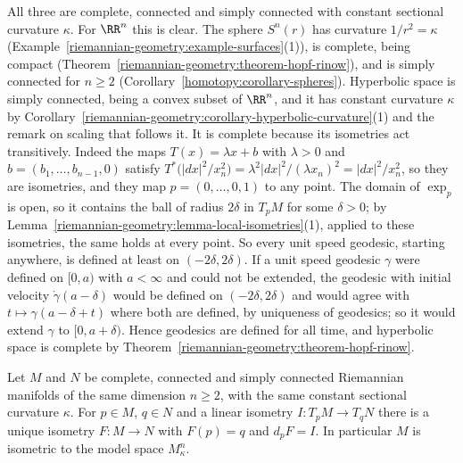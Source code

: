 All three are complete, connected and simply connected with constant sectional curvature $\kappa$. For $\RR^n$ this is clear. The sphere $S^n(r)$ has curvature
$1/r^2 = \kappa$ (Example~\ref{riemannian-geometry:example-surfaces}(1)), is complete, being compact (Theorem~\ref{riemannian-geometry:theorem-hopf-rinow}), and is simply
connected for $n \geq 2$ (Corollary~\ref{homotopy:corollary-spheres}). Hyperbolic space is simply connected, being a convex subset of $\RR^n$, and it has constant curvature $\kappa$ by
Corollary~\ref{riemannian-geometry:corollary-hyperbolic-curvature}(1) and the remark on scaling that follows it. It is complete because its isometries act transitively. Indeed the maps
$T(x) = \lambda x + b$ with $\lambda > 0$ and $b = (b_1, \ldots, b_{n-1}, 0)$ satisfy $T^*\bigl(|dx|^2/x_n^2\bigr) = \lambda^2|dx|^2/(\lambda x_n)^2 = |dx|^2/x_n^2$, so they are isometries, and they map
$p = (0, \ldots, 0, 1)$ to any point. The domain of $\exp_p$ is open, so it contains the ball of radius $2\delta$ in $T_pM$ for some $\delta > 0$; by
Lemma~\ref{riemannian-geometry:lemma-local-isometries}(1), applied to these isometries, the same holds at every point. So every unit speed geodesic, starting anywhere, is defined at least on
$(-2\delta, 2\delta)$. If a unit speed geodesic $\gamma$ were defined on $[0, a)$ with $a < \infty$ and could not be extended, the geodesic with initial velocity $\dot\gamma(a - \delta)$ would be
defined on $(-2\delta, 2\delta)$ and would agree with $t \mapsto \gamma(a - \delta + t)$ where both are defined, by uniqueness of geodesics; so it would extend $\gamma$ to $[0, a + \delta)$. Hence
geodesics are defined for all time, and hyperbolic space is complete by Theorem~\ref{riemannian-geometry:theorem-hopf-rinow}.

\begin{theorem}\label{riemannian-geometry:theorem-killing-hopf}
Let $M$ and $N$ be complete, connected and simply connected Riemannian manifolds of the same dimension $n \geq 2$, with the same constant sectional curvature
$\kappa$. For $p \in M$, $q \in N$ and a linear isometry $I \colon T_pM \to T_qN$ there is a unique isometry $F \colon M \to N$ with $F(p) = q$ and $d_pF = I$.
In particular $M$ is isometric to the model space $M^n_\kappa$.
\end{theorem}

